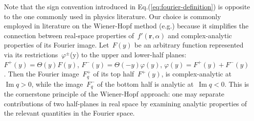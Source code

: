 \documentclass[preprint,aps,eqsecnum, prb]{revtex4-1}
\newcommand{\fplus}[1]{{#1}^{+}}
\newcommand{\fminus}[1]{{#1}^{-}}
\newcommand{\fplusminus}[1]{{#1}^{\pm}}
\renewcommand{\Im}{\mathop{\mathrm{Im}}\nolimits}
\begin{document}
Note that the sign convention introduced in Eq.(\ref{eq:fourier-definition})
is opposite to the one commonly used in physics literature. Our choice is
commonly employed in literature on the Wiener-Hopf
method (e.g.\cite{bib:wiener-hopf})
because it simplifies the connection between real-space
properties of~$f'({\bm r}, \alpha)$
and complex-analytic properties of its Fourier image.
Let~$F(y)$ be an arbitrary function represented
via its restrictions~$\fplusminus{\varphi}$(y)
to the upper and lower-half planes: $\fplus{F}(y) = \Theta(y)F(y)$,
$\fminus{F}(y) = \Theta(-y) \varphi(y)$,
$\varphi(y) = \fplus{F}(y) + \fminus{F}(y)$.
Then the Fourier image~$\fplus{F}_q$ of its top half~$\fplus{F}(y)$,
is complex-analytic at~$\Im q > 0$, while the image~$\fminus{F}_{q}$
of the bottom half is analytic at~$\Im q < 0$.
This is the cornerstone principle of
the Wiener-Hopf approach: one may separate contributions
of two half-planes in real space by examining analytic properties
of the relevant quantities in the Fourier space.
\end{document}
